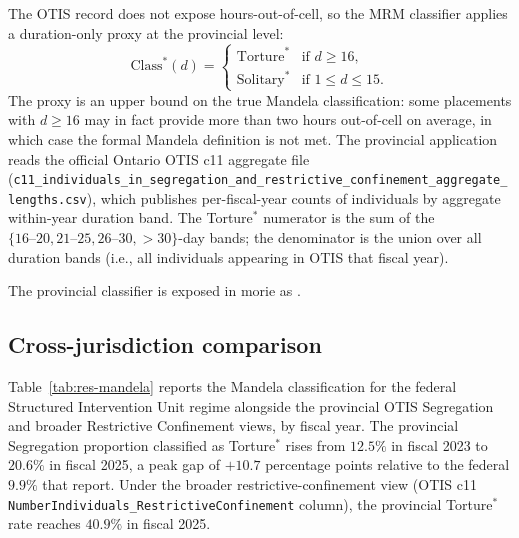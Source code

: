 \documentclass[article,shortnames,nojss]{jss}
\newcommand{\OTIS}{\textsf{OTIS}}
\begin{document}
The \OTIS{} record does not expose hours-out-of-cell, so the MRM
classifier applies a duration-only proxy at the provincial level:
\begin{equation}
\label{eq:provincial-mandela}
  \mathrm{Class}^{\ast}(d) = \begin{cases}
    \mathrm{Torture}^{\ast}  & \text{if } d \ge 16, \\
    \mathrm{Solitary}^{\ast} & \text{if } 1 \le d \le 15.
  \end{cases}
\end{equation}
The proxy is an upper bound on the true Mandela classification: some
placements with $d \ge 16$ may in fact provide more than two hours
out-of-cell on average, in which case the formal Mandela definition
is not met. The provincial application reads the official Ontario
\OTIS{} c11 aggregate file
(\texttt{c11\_individuals\_in\_segregation\_and\_restrictive\_confinement\_aggregate\_lengths.csv}),
which publishes per-fiscal-year counts of individuals by aggregate
within-year duration band. The Torture$^{\ast}$ numerator is the
sum of the $\{16\text{--}20, 21\text{--}25, 26\text{--}30,
>30\}$-day bands; the denominator is the union over all duration
bands (i.e., all individuals appearing in \OTIS{} that fiscal year).

The provincial classifier is exposed in morie as
.

\subsection{Cross-jurisdiction comparison}
\label{sec:mandela-cross-jurisdiction}

Table~\ref{tab:res-mandela} reports the Mandela classification for the
federal Structured Intervention Unit regime \citep{SprottDoob2023}
alongside the provincial \OTIS{} Segregation and broader Restrictive
Confinement views, by fiscal year. The provincial Segregation
proportion classified as Torture$^{\ast}$ rises from $12.5\%$ in
fiscal 2023 to $20.6\%$ in fiscal 2025, a peak gap of $+10.7$
percentage points relative to the federal $9.9\%$ that
\citet{SprottDoob2023} report. Under the broader
restrictive-confinement view (\OTIS{} c11
\texttt{NumberIndividuals\_RestrictiveConfinement} column), the
provincial Torture$^{\ast}$ rate reaches $40.9\%$ in fiscal 2025.
\end{document}
